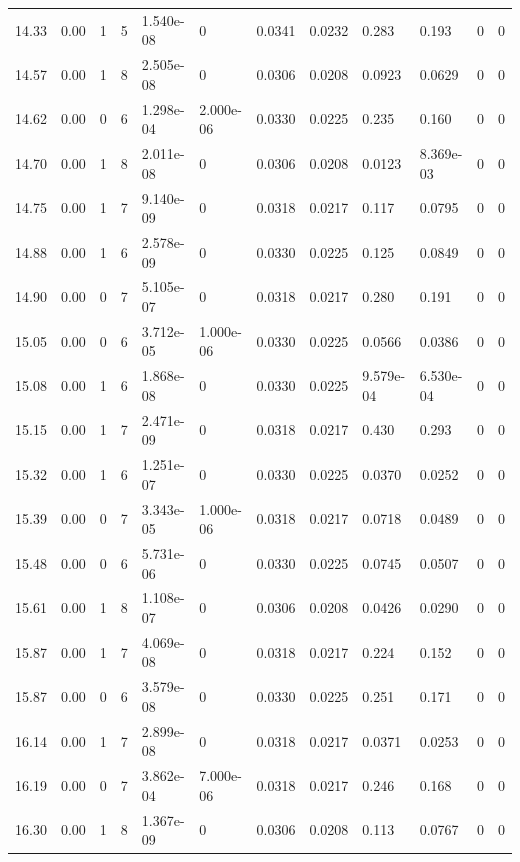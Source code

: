 \documentclass[preview]{standalone}
\begin{document}
{{{{{\begin{tabular}{L{1.2cm}C{1.2cm} C{0.3cm}C{0.5cm} C{1.4cm}C{1.4cm} C{1.4cm}C{1.4cm} C{1.6cm}C{1.6cm} C{1.6cm}C{1.6cm}}
  14.33  &  0.00  & 1     &  5 &  1.540e-08  & 0  &  0.0341&   0.0232& 0.283 & 0.193   &  0 & 0  \\ 
  14.57  &  0.00  & 1     &  8 &  2.505e-08  & 0  &  0.0306&   0.0208& 0.0923 & 0.0629   &  0 & 0  \\ 
  14.62  &  0.00  & 0     &  6 &  1.298e-04  & 2.000e-06  &  0.0330&   0.0225& 0.235 & 0.160   &  0 & 0  \\ 
  14.70  &  0.00  & 1     &  8 &  2.011e-08  & 0  &  0.0306&   0.0208& 0.0123 & 8.369e-03   &  0 & 0  \\ 
  14.75  &  0.00  & 1     &  7 &  9.140e-09  & 0  &  0.0318&   0.0217& 0.117 & 0.0795   &  0 & 0  \\ 
  14.88  &  0.00  & 1     &  6 &  2.578e-09  & 0  &  0.0330&   0.0225& 0.125 & 0.0849   &  0 & 0  \\ 
  14.90  &  0.00  & 0     &  7 &  5.105e-07  & 0  &  0.0318&   0.0217& 0.280 & 0.191   &  0 & 0  \\ 
  15.05  &  0.00  & 0     &  6 &  3.712e-05  & 1.000e-06  &  0.0330&   0.0225& 0.0566 & 0.0386   &  0 & 0  \\ 
  15.08  &  0.00  & 1     &  6 &  1.868e-08  & 0  &  0.0330&   0.0225& 9.579e-04 & 6.530e-04   &  0 & 0  \\ 
  15.15  &  0.00  & 1     &  7 &  2.471e-09  & 0  &  0.0318&   0.0217& 0.430 & 0.293   &  0 & 0  \\ 
  15.32  &  0.00  & 1     &  6 &  1.251e-07  & 0  &  0.0330&   0.0225& 0.0370 & 0.0252   &  0 & 0  \\ 
  15.39  &  0.00  & 0     &  7 &  3.343e-05  & 1.000e-06  &  0.0318&   0.0217& 0.0718 & 0.0489   &  0 & 0  \\ 
  15.48  &  0.00  & 0     &  6 &  5.731e-06  & 0  &  0.0330&   0.0225& 0.0745 & 0.0507   &  0 & 0  \\ 
  15.61  &  0.00  & 1     &  8 &  1.108e-07  & 0  &  0.0306&   0.0208& 0.0426 & 0.0290   &  0 & 0  \\ 
  15.87  &  0.00  & 1     &  7 &  4.069e-08  & 0  &  0.0318&   0.0217& 0.224 & 0.152   &  0 & 0  \\ 
  15.87  &  0.00  & 0     &  6 &  3.579e-08  & 0  &  0.0330&   0.0225& 0.251 & 0.171   &  0 & 0  \\ 
  16.14  &  0.00  & 1     &  7 &  2.899e-08  & 0  &  0.0318&   0.0217& 0.0371 & 0.0253   &  0 & 0  \\ 
  16.19  &  0.00  & 0     &  7 &  3.862e-04  & 7.000e-06  &  0.0318&   0.0217& 0.246 & 0.168   &  0 & 0  \\ 
  16.30  &  0.00  & 1     &  8 &  1.367e-09  & 0  &  0.0306&   0.0208& 0.113 & 0.0767   &  0 & 0  \\ 

\end{tabular}}}}}}
\end{document}
